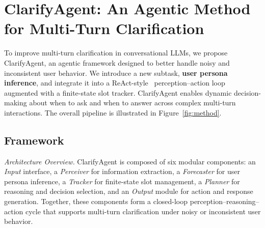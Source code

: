 \documentclass[sigconf]{acmart}
\newcommand{\model}{ClarifyAgent\xspace}
\begin{document}










\section{ClarifyAgent: An Agentic Method for Multi-Turn Clarification}

To improve multi-turn clarification in conversational LLMs, we propose \model, an agentic framework designed to better handle noisy and inconsistent user behavior. We introduce a new subtask, \textbf{user persona inference}, and integrate it into a ReAct-style~\cite{yao2022react} perception--action loop augmented with a finite-state slot tracker. \model{} enables dynamic decision-making about when to ask and when to answer across complex multi-turn interactions. The overall pipeline is illustrated in Figure~\ref{fig:method}.

\vspace{-0.05in}

\subsection{Framework}

\textit{Architecture Overview.}
\model{} is composed of six modular components: an \emph{Input} interface, a \emph{Perceiver} for information extraction, a \emph{Forecaster} for user persona inference, a \emph{Tracker} for finite-state slot management, a \emph{Planner} for reasoning and decision selection, and an \emph{Output} module for action and response generation. Together, these components form a closed-loop perception–reasoning–action cycle that supports multi-turn clarification under noisy or inconsistent user behavior.
\end{document}
